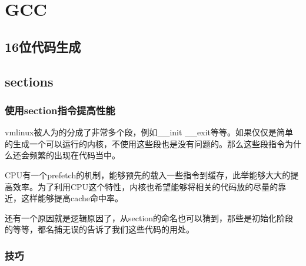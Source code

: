 \chapter{GCC}
\section{16位代码生成}
\section{sections}
\subsection{使用section指令提高性能}
vmlinux被人为的分成了非常多个段，例如__init __exit等等。如果仅仅是简单的生成一个可以运行的内核，不使用这些段也是没有问题的。那么这些段指令为什么还会频繁的出现在代码当中。

CPU有一个prefetch的机制，能够预先的载入一些指令到缓存，此举能够大大的提高效率。为了利用CPU这个特性，内核也希望能够将相关的代码放的尽量的靠近，这样能够提高cache命中率。

还有一个原因就是逻辑原因了，从section的命名也可以猜到，那些是初始化阶段的等等，都名捕无误的告诉了我们这些代码的用处。


\subsection{技巧}
